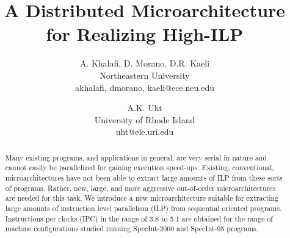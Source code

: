 \documentclass[10pt,twocolumn]{IEEEtran}
\begin{document}
%
\parskip 2mm
%
%
\title{A Distributed Microarchitecture for Realizing High-ILP}
%
\author{
A. {Khalafi}, D. Morano, D.R. Kaeli\\
Northeastern University\\
{{akhalafi}, dmorano, kaeli}@ece.neu.edu\\
\and
A.K. Uht\\
University of Rhode Island\\ 
uht@ele.uri.edu
}
%
%
%
%
\maketitle
%
%
%
\begin{abstract}
Many existing programs, and applications in general, are
very serial in nature and cannot easily be parallelized
for gaining execution speed-ups.
Existing, conventional, microarchitectures have not
been able to extract large amounts of ILP from these sorts of
programs.
Rather, new, large, and more aggressive out-of-order microarchitectures
are needed for this task.
We introduce a new microarchitecture suitable for extracting
large amounts of instruction level parallelism (ILP) from sequential
oriented programs.
Instructions per clocks (IPC)
in the range of 3.8 to 5.1 are obtained for the
range of machine configurations studied running SpecInt-2000 and
SpecInt-95 programs. 
\end{abstract}
%
%
\end{document}
